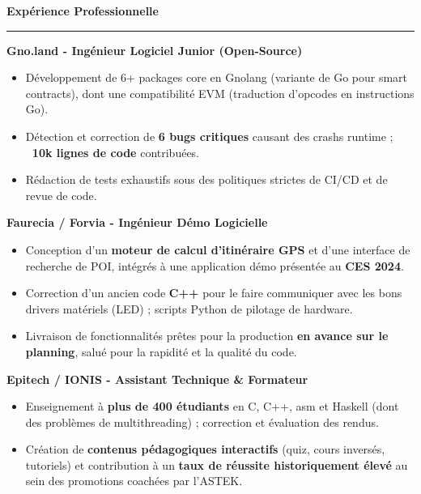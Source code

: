 \documentclass[9pt]{extarticle}
\begin{document}
\par\vspace{5pt}

{\large\bfseries Expérience Professionnelle}
\par\vspace{-8pt}
\rule{\linewidth}{0.4pt}
\par\vspace{5pt}

{\bfseries Gno.land - Ingénieur Logiciel Junior (Open-Source)}
\begin{itemize}[noitemsep, topsep=0pt]
	\item Développement de 6+ packages core en Gnolang (variante de Go pour smart contracts), dont une compatibilité EVM (traduction d'opcodes en instructions Go).
	\item Détection et correction de {\bfseries 6 bugs critiques} causant des crashs runtime ; {\bfseries ~10k lignes de code} contribuées.
	\item Rédaction de tests exhaustifs sous des politiques strictes de CI/CD et de revue de code.
\end{itemize}

\par\vspace{5pt}

{\bfseries Faurecia / Forvia - Ingénieur Démo Logicielle}
\begin{itemize}[noitemsep, topsep=0pt]
	\item Conception d'un {\bfseries moteur de calcul d'itinéraire GPS} et d'une interface de recherche de POI, intégrés à une application démo présentée au {\bfseries CES 2024}.
	\item Correction d'un ancien code {\bfseries C++} pour le faire communiquer avec les bons drivers matériels (LED) ; scripts Python de pilotage de hardware.
	\item Livraison de fonctionnalités prêtes pour la production {\bfseries en avance sur le planning}, salué pour la rapidité et la qualité du code.
\end{itemize}

\par\vspace{5pt}

{\bfseries Epitech / IONIS - Assistant Technique \& Formateur}
\begin{itemize}[noitemsep, topsep=0pt]
	\item Enseignement à {\bfseries plus de 400 étudiants} en C, C++, asm et Haskell (dont des problèmes de multithreading) ; correction et évaluation des rendus.
	\item Création de {\bfseries contenus pédagogiques interactifs} (quiz, cours inversés, tutoriels) et contribution à un {\bfseries taux de réussite historiquement élevé} au sein des promotions coachées par l'ASTEK.
\end{itemize}
\end{document}
